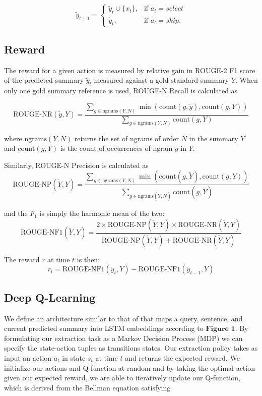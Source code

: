 \documentclass[12pt]{article}
\begin{document}
\begin{equation}
	\tilde{y}_{t + 1} =
\begin{cases}
	\tilde{y}_{t} \cup \{ x_t \},	& \text{if } a_t = select  \\
	\tilde{y}_{t}, 			& \text{if } a_t = skip.
\end{cases}
\end{equation}

\subsection{Reward} 
The reward for a given action is measured by relative gain in ROUGE-2 F1 score of the predicted summary $\tilde{y}_{t}$ measured against a gold standard summary $Y$. When only one gold summary reference is used, ROUGE-N Recall is calculated as 

\[ \textrm{ROUGE-NR}(\tilde{y}, Y) = 
    \frac{\sum_{g \in \textrm{ngrams}(Y,N)} 
    \min \left(\textrm{count}(g, \tilde{y}), \textrm{count}(g, Y)\right)}{
    \sum_{g \in \textrm{ngrams}(Y,N)} 
    \textrm{count}(g, Y)
    }
\]

where $\textrm{ngrams}(Y, N)$ returns the set of ngrams of order $N$ in the summary $Y$ and $\textrm{count}(g, Y)$ is the count of occurrences of ngram $g$ in $Y.$

Similarly, ROUGE-N Precision is calculated as 
\[ \textrm{ROUGE-NP}(\tilde{Y}, Y) = 
    \frac{\sum_{g \in \textrm{ngrams}(Y,N)} 
    \min \left(\textrm{count}(g, \tilde{Y}), \textrm{count}(g, Y)\right)}{
        \sum_{g \in \textrm{ngrams}(\tilde{Y},N)} 
        \textrm{count}(g, \tilde{Y})
    }
\]

and the $F_1$ is simply the harmonic mean of the two:
\[ \textrm{ROUGE-NF1}(\tilde{Y}, Y) = \frac{ 2 \times 
\textrm{ROUGE-NP}(\tilde{Y}, Y) \times \textrm{ROUGE-NR}(\tilde{Y}, Y)
}{ \textrm{ROUGE-NP}(\tilde{Y}, Y) + \textrm{ROUGE-NR}(\tilde{Y}, Y) } \]


The reward $r$ at time $t$ is then:
\[ r_t = \textrm{ROUGE-NF1}(\tilde{y}_{t}, Y) - 
\textrm{ROUGE-NF1}(\tilde{y}_{t-1}, Y) \]

\subsection{Deep Q-Learning}

We define an architecture similar to that of \cite{narasimhan2015language} that maps a query, sentence, and current predicted summary into LSTM embeddings according to $\textbf{Figure 1}$. By formulating our extraction task as a Markov Decision Process (MDP) we can specify the state-action tuples as transitions states. Our extraction policy takes as input an action $a_t$ in state $s_t$ at time $t$ and returns the expected reward. We initialize our actions and Q-function at random and by taking the optimal action given our expected reward, we are able to iteratively update our Q-function, which is derived from the Bellman equation \cite{sutton1998reinforcement} satisfying
\end{document}
